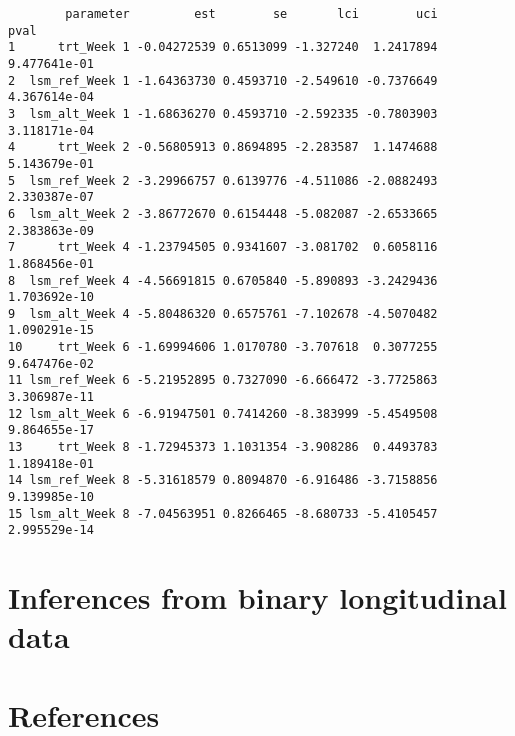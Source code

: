 \documentclass[
  letterpaper,
  DIV=11,
  numbers=noendperiod]{scrreprt}
\begin{document}
\begin{verbatim}
        parameter         est        se       lci        uci         pval
1      trt_Week 1 -0.04272539 0.6513099 -1.327240  1.2417894 9.477641e-01
2  lsm_ref_Week 1 -1.64363730 0.4593710 -2.549610 -0.7376649 4.367614e-04
3  lsm_alt_Week 1 -1.68636270 0.4593710 -2.592335 -0.7803903 3.118171e-04
4      trt_Week 2 -0.56805913 0.8694895 -2.283587  1.1474688 5.143679e-01
5  lsm_ref_Week 2 -3.29966757 0.6139776 -4.511086 -2.0882493 2.330387e-07
6  lsm_alt_Week 2 -3.86772670 0.6154448 -5.082087 -2.6533665 2.383863e-09
7      trt_Week 4 -1.23794505 0.9341607 -3.081702  0.6058116 1.868456e-01
8  lsm_ref_Week 4 -4.56691815 0.6705840 -5.890893 -3.2429436 1.703692e-10
9  lsm_alt_Week 4 -5.80486320 0.6575761 -7.102678 -4.5070482 1.090291e-15
10     trt_Week 6 -1.69994606 1.0170780 -3.707618  0.3077255 9.647476e-02
11 lsm_ref_Week 6 -5.21952895 0.7327090 -6.666472 -3.7725863 3.306987e-11
12 lsm_alt_Week 6 -6.91947501 0.7414260 -8.383999 -5.4549508 9.864655e-17
13     trt_Week 8 -1.72945373 1.1031354 -3.908286  0.4493783 1.189418e-01
14 lsm_ref_Week 8 -5.31618579 0.8094870 -6.916486 -3.7158856 9.139985e-10
15 lsm_alt_Week 8 -7.04563951 0.8266465 -8.680733 -5.4105457 2.995529e-14
\end{verbatim}


\hypertarget{inferences-from-binary-longitudinal-data}{%
\chapter{Inferences from binary longitudinal
data}\label{inferences-from-binary-longitudinal-data}}


\hypertarget{references}{%
\chapter*{References}\label{references}}

\end{document}
